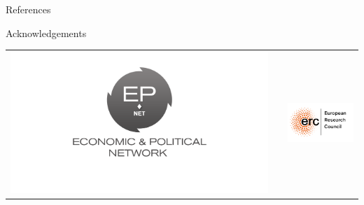 \documentclass[final]{beamer}
\newlength{\onecolwid}
\begin{document}
\begin{frame}[t]
\begin{columns}[t]
\begin{column}{\onecolwid}
\begin{block}{References}
\begin{thebibliography}{50}
\end{thebibliography}

\end{block}



\begin{block}{Acknowledgements}

\small{}

\end{block}




\begin{center}
\begin{tabular}{ccc}
\includegraphics[width=0.4\linewidth]{images/epnet.png} & \hfill & \includegraphics[width=0.4\linewidth]{images/erc.png}
\end{tabular}
\end{center}


\end{column} %

\end{columns} %

\end{frame} %
\end{document}
